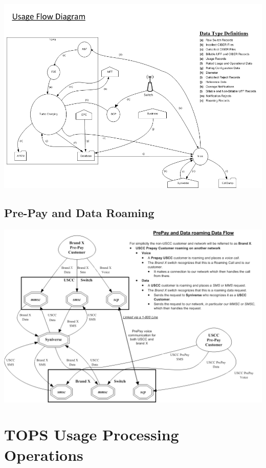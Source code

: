 \documentclass[12pt,twoside]{article}
\begin{document}
\newpage
\begin{landscape}  

   \includegraphics[width=20cm]{Pictures/usage_flow.jpg}
\end{landscape} 
\newpage
\begin{landscape}  
\subsection{Pre-Pay and Data Roaming}
\label{sec-2-5}

    \includegraphics[width=23cm]{Pictures/roamingPrePay.png}
\end{landscape} 
\newpage
\section{TOPS Usage Processing Operations}
\label{sec-3}
\end{document}
